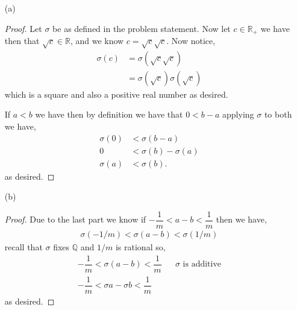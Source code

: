 \documentclass[11pt]{article}
\newcommand{\qq}{\mathbb Q}   %
\newcommand{\rr}{\mathbb R}   %
\begin{document}
\begin{itemize}
  \item[(a)]
  \begin{proof}
    Let $\sigma$ be as defined in the problem statement. Now let $c\in\rr_+$ we have then that $\sqrt{c}\in \rr$, and we know $c = \sqrt{c}\sqrt{c}$. Now notice,
    \begin{align*}
      \sigma(c) &= \sigma(\sqrt{c}\sqrt{c}) \\
      &= \sigma(\sqrt{c})\sigma(\sqrt{c})
    \end{align*}
    which is a square and also a positive real number as desired. 

    If $a < b$ we have then by definition we have that $ 0 < b -a$ applying $\sigma$ to both we have,
    \begin{align*}
      \sigma(0) &< \sigma(b - a)  \\
      0 &< \sigma(b) - \sigma(a) \\
      \sigma(a) &< \sigma(b).
    \end{align*}
    as desired. 
  \end{proof} 
  \vspace*{15pt}
  \item[(b)]
  \begin{proof}
    Due to the last part we know if  $-\dfrac{1}{m} < a-b < \dfrac{1}{m}$ then we have,
    \begin{align*}
      \sigma(-1/m) < \sigma(a-b) < \sigma(1/m)
    \end{align*}
    recall that $\sigma$ fixes $\qq$ and $1/m$ is rational so,
    \begin{align*}
      -\dfrac{1}{m} < \sigma(a-b) < \dfrac{1}{m} &&\sigma \text{ is additive}\\
      -\dfrac{1}{m} < \sigma a - \sigma b < \dfrac{1}{m}
    \end{align*}
    as desired. 
  

\end{proof}
\end{itemize}
\end{document}
